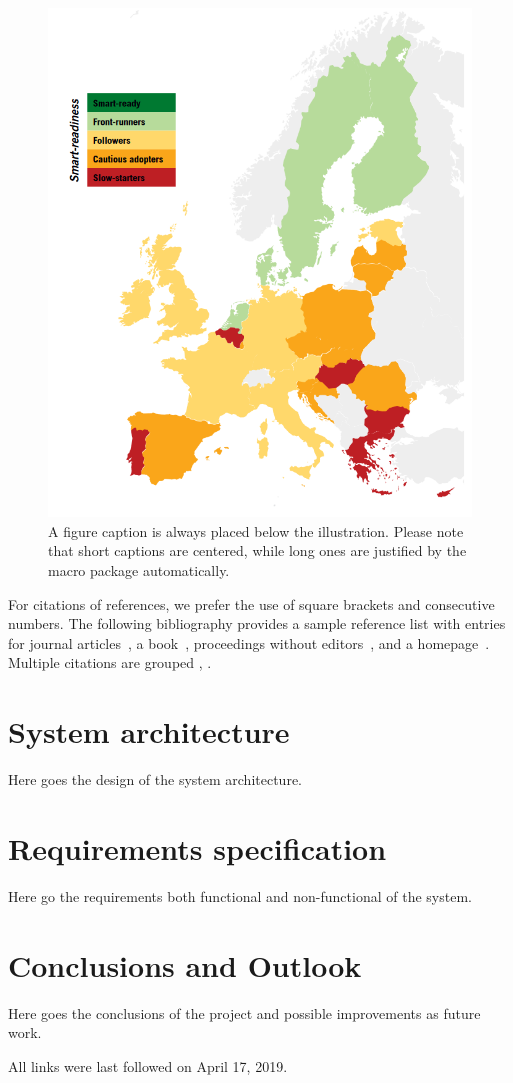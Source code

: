 \documentclass[runningheads]{llncs}
\begin{document}
\begin{figure}
\includegraphics[width=\textwidth]{fig1}
\caption{A figure caption is always placed below the illustration.
Please note that short captions are centered, while long ones are
justified by the macro package automatically.} \label{fig1}
\end{figure}

For citations of references, we prefer the use of square brackets
and consecutive numbers. The following bibliography provides
a sample reference list with entries for journal
articles~\cite{ref_article1}, a book~\cite{ref_book1}, proceedings without editors~\cite{ref_proc1},
and a homepage~\cite{ref_url1}. Multiple citations are grouped
\cite{ref_article1,ref_book1},
\cite{ref_article1,ref_book1,ref_proc1,ref_url1}.

\section{System architecture}
Here goes the design of the system architecture.

\section{Requirements specification}
Here go the requirements both functional and non-functional of the system.

\section{Conclusions and Outlook}
Here goes the conclusions of the project and possible improvements as future work.

%
%



All links were last followed on April 17, 2019.
\end{document}
